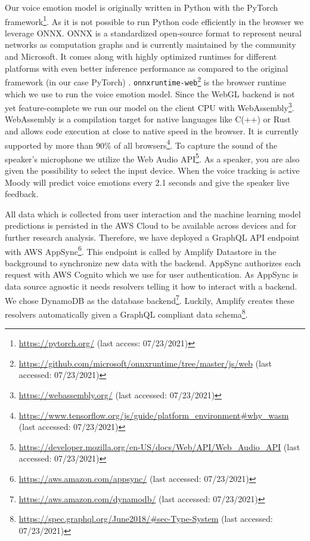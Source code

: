 Our voice emotion model is originally written in Python with the PyTorch framework\footnote{\url{https://pytorch.org/} (last access: 07/23/2021)}. As it is not possible to run Python code efficiently in the browser we leverage ONNX. ONNX is a standardized open-source format to represent neural networks as computation graphs and is currently maintained by the community and Microsoft. It comes along with highly optimized runtimes for different platforms with even better inference performance as compared to the original framework (in our case PyTorch) \cite{onnx_runtime_developers_onnx_2021}. \texttt{onnxruntime-web}\footnote{\url{https://github.com/microsoft/onnxruntime/tree/master/js/web} (last accessed: 07/23/2021)} is the browser runtime which we use to run the voice emotion model. Since the WebGL backend is not yet feature-complete we run our model on the client CPU with WebAssembly\footnote{\url{https://webassembly.org/} (last accessed: 07/23/2021)}. WebAssembly is a compilation target for native languages like C(++) or Rust and allows code execution at close to native speed in the browser. It is currently supported by more than 90\% of all browsers\footnote{\url{https://www.tensorflow.org/js/guide/platform_environment#why_wasm} (last accessed: 07/23/2021)}. To capture the sound of the speaker's microphone we utilize the Web Audio API\footnote{\url{https://developer.mozilla.org/en-US/docs/Web/API/Web_Audio_API} (last accessed: 07/23/2021)}. As a speaker, you are also given the possibility to select the input device. When the voice tracking is active Moody will predict voice emotions every 2.1 seconds and give the speaker live feedback.

All data which is collected from user interaction and the machine learning model predictions is persisted in the AWS Cloud to be available across devices and for further research analysis. Therefore, we have deployed a GraphQL API endpoint with AWS AppSync\footnote{\url{https://aws.amazon.com/appsync/} (last accessed: 07/23/2021)}. This endpoint is called by Amplify Datastore in the background to synchronize new data with the backend. AppSync authorizes each request with AWS Cognito which we use for user authentication. As AppSync is data source agnostic it needs resolvers telling it how to interact with a backend. We chose DynamoDB as the database backend\footnote{\url{https://aws.amazon.com/dynamodb/} (last accessed: 07/23/2021)}. Luckily, Amplify creates these resolvers automatically given a GraphQL compliant data schema\footnote{\url{https://spec.graphql.org/June2018/#sec-Type-System} (last accessed: 07/23/2021)}.

